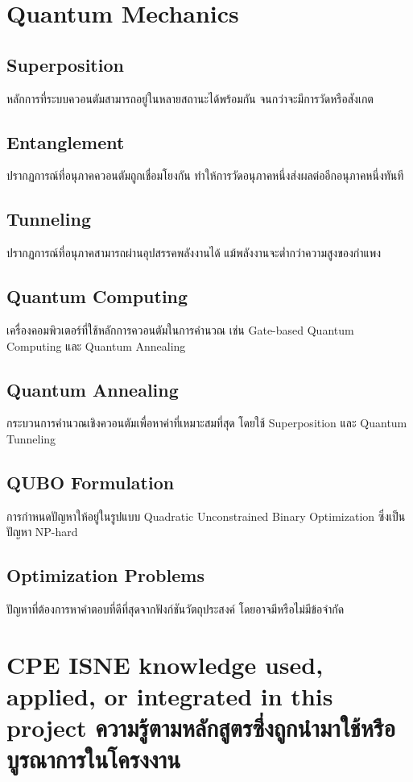 \section{Quantum Mechanics}
\subsection{Superposition}
หลักการที่ระบบควอนตัมสามารถอยู่ในหลายสถานะได้พร้อมกัน จนกว่าจะมีการวัดหรือสังเกต

\subsection{Entanglement}
ปรากฏการณ์ที่อนุภาคควอนตัมถูกเชื่อมโยงกัน ทำให้การวัดอนุภาคหนึ่งส่งผลต่ออีกอนุภาคหนึ่งทันที

\subsection{Tunneling}
ปรากฏการณ์ที่อนุภาคสามารถผ่านอุปสรรคพลังงานได้ แม้พลังงานจะต่ำกว่าความสูงของกำแพง

\subsection{Quantum Computing}
เครื่องคอมพิวเตอร์ที่ใช้หลักการควอนตัมในการคำนวณ เช่น Gate-based Quantum Computing และ Quantum Annealing

\subsection{Quantum Annealing}
กระบวนการคำนวณเชิงควอนตัมเพื่อหาค่าที่เหมาะสมที่สุด โดยใช้ Superposition และ Quantum Tunneling

\subsection{QUBO Formulation}
การกำหนดปัญหาให้อยู่ในรูปแบบ Quadratic Unconstrained Binary Optimization ซึ่งเป็นปัญหา NP-hard

\subsection{Optimization Problems}
ปัญหาที่ต้องการหาคำตอบที่ดีที่สุดจากฟังก์ชันวัตถุประสงค์ โดยอาจมีหรือไม่มีข้อจำกัด

\section{\ifenglish%
\ifcpe CPE \else ISNE \fi knowledge used, applied, or integrated in this project
\else%
ความรู้ตามหลักสูตรซึ่งถูกนำมาใช้หรือบูรณาการในโครงงาน
\fi
}

